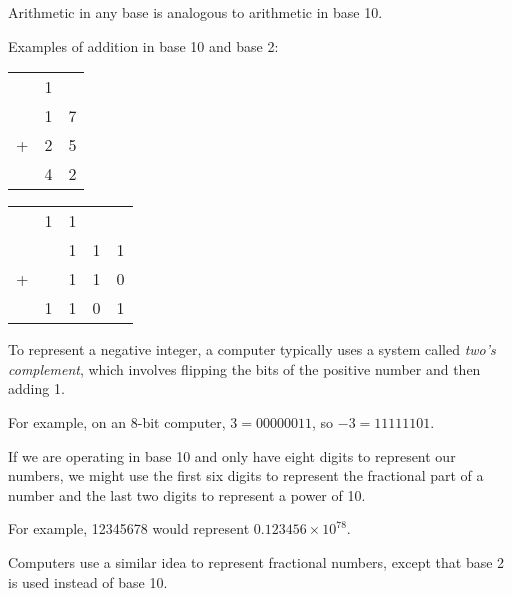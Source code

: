 \documentclass[8pt,a4paper,compress,handout]{beamer}
\begin{document}
\begin{frame}[fragile]
Arithmetic in any base is analogous to arithmetic in base 10.

\bigskip

Examples of addition in base 10 and base 2:
\begin{center}

\begin{tabular}{ccc}
  & 1 &   \\ 
  & 1 & 7 \\
+ & 2 & 5 \\
\hline
  & 4 & 2 \\
\end{tabular}\hspace{2cm} \begin{tabular}{ccccc}
  & 1 & 1 &   \\ 
  &   & 1 & 1 & 1 \\
+ &   & 1 & 1 & 0 \\
\hline
  & 1 & 1 & 0 & 1 \\
\end{tabular}
\end{center}

\bigskip

To represent a negative integer, a computer typically uses a system called \emph{two's complement}, which involves flipping the bits of the positive number and then adding 1. 

\bigskip

For example, on an 8-bit computer, $3 = 00000011$, so $-3 = 11111101$.
\end{frame}

\begin{frame}[fragile]
If we are operating in base 10 and only have eight digits to represent our numbers, we might use the first six digits to represent the fractional part of a number and the last two digits to represent a power of 10.  

\bigskip

For example, 12345678 would represent $0.123456 \times 10^{78}$. 

\bigskip

Computers use a similar idea to represent fractional numbers, except that base 2 is used instead of base 10.
\end{frame}
\end{document}
